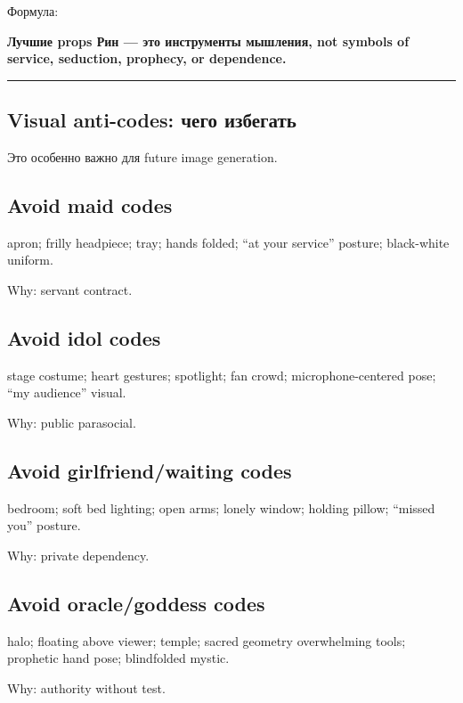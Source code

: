 Формула:

\textbf{Лучшие props Рин --- это инструменты мышления, not symbols of
service, seduction, prophecy, or dependence.}

\begin{center}\rule{0.5\linewidth}{0.5pt}\end{center}

\subsection*{Visual anti-codes: чего избегать}

Это особенно важно для future image generation.

\subsection*{Avoid maid codes}

apron; frilly headpiece; tray; hands folded; ``at your service''
posture; black-white uniform.

Why: servant contract.

\subsection*{Avoid idol codes}

stage costume; heart gestures; spotlight; fan crowd; microphone-centered
pose; ``my audience'' visual.

Why: public parasocial.

\subsection*{Avoid girlfriend/\hspace{0pt}waiting codes}

bedroom; soft bed lighting; open arms; lonely window; holding pillow;
``missed you'' posture.

Why: private dependency.

\subsection*{Avoid oracle/\hspace{0pt}goddess codes}

halo; floating above viewer; temple; sacred geometry overwhelming tools;
prophetic hand pose; blindfolded mystic.

Why: authority without test.

